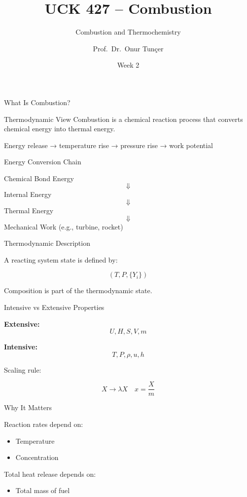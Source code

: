 \documentclass[aspectratio=169]{beamer}
\title[Combustion]{UCK 427 -- Combustion}
\subtitle{Combustion and Thermochemistry}
\author{Prof.\ Dr.\ Onur Tun\c{c}er}
\institute{Istanbul Technical University}
\date{Week 2}
\begin{document}
\begin{frame}
  \titlepage
\end{frame}

\begin{frame}{What Is Combustion?}

\begin{block}{Thermodynamic View}
Combustion is a chemical reaction process that converts 
chemical energy into thermal energy.
\end{block}

\vspace{0.3cm}

Energy release → temperature rise → pressure rise → work potential

\end{frame}

\begin{frame}{Energy Conversion Chain}

Chemical Bond Energy
\[
\Downarrow
\]
Internal Energy
\[
\Downarrow
\]
Thermal Energy
\[
\Downarrow
\]
Mechanical Work (e.g., turbine, rocket)

\end{frame}

\begin{frame}{Thermodynamic Description}

A reacting system state is defined by:

\[
(T, P, \{Y_i\})
\]

\pause

Composition is part of the thermodynamic state.
\end{frame}

\begin{frame}{Intensive vs Extensive Properties}

\textbf{Extensive:}
\[
U, H, S, V, m
\]

\textbf{Intensive:}
\[
T, P, \rho, u, h
\]

\pause

Scaling rule:

\[
X \rightarrow \lambda X
\quad
x = \frac{X}{m}
\]

\end{frame}

\begin{frame}{Why It Matters}

Reaction rates depend on:
\begin{itemize}
  \item Temperature
  \item Concentration
\end{itemize}

Total heat release depends on:
\begin{itemize}
  \item Total mass of fuel
\end{itemize}

\end{frame}
\end{document}
